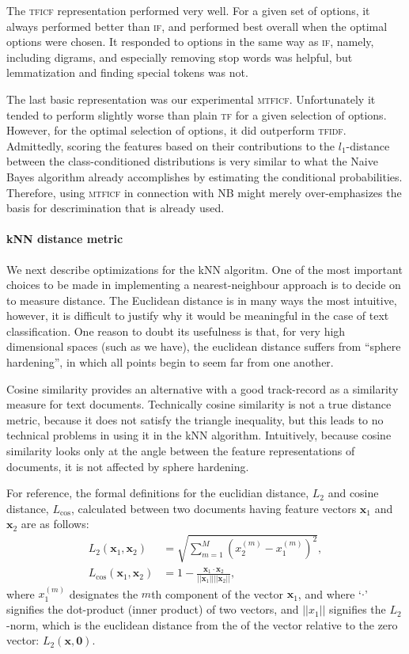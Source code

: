 \documentclass[conference,letterpaper]{IEEEtran}
\begin{document}
The \textsc{tficf} representation performed very well.  For a given set of 
options, it always performed better than \textsc{if}, and performed best 
overall when the optimal options were chosen.  It responded to options in the 
same
way as \textsc{if}, namely, including digrams, and especially removing stop
words was helpful, but lemmatization and finding special tokens was not.

The last basic representation was our experimental \textsc{mtficf}.  
Unfortunately it tended to perform slightly worse than plain \textsc{tf} for
a given selection of options.  However, for the optimal selection of options,
it did outperform \textsc{tfidf}.  Admittedly, scoring the 
features based on their contributions to the $l_1$-distance between the 
class-conditioned distributions is very similar to what the Naive Bayes 
algorithm already accomplishes by estimating the conditional probabilities.
Therefore, using \textsc{mtficf} in connection with NB might merely 
over-emphasizes the basis for descrimination that is already used.


\paragraph*{kNN distance metric}
We next describe optimizations for the kNN algoritm.  One of the most important
choices to be made in implementing a nearest-neighbour approach is to decide
on to measure distance.  The Euclidean distance is in many ways
the most intuitive, however, it is difficult to justify why it would be
meaningful in the case of text classification.  One reason to doubt its 
usefulness is that, for very high dimensional spaces (such as we have), 
the euclidean distance suffers from ``sphere hardening'', in which all points
begin to seem far from one another.

Cosine similarity provides an alternative with a good track-record as a 
similarity measure for text documents.  Technically cosine similarity is not
a true distance metric, because it does not satisfy the triangle inequality,
but this leads to no technical problems in using it in the kNN algorithm.
Intuitively, because cosine similarity looks only at the angle between 
the feature representations of documents, it is not affected by sphere 
hardening.  

For reference, the formal definitions for the euclidian distance, $L_2$ and
cosine distance, $L_\mathrm{cos}$, calculated between two documents having 
feature vectors $\mathbf{x}_1$ and $\mathbf{x}_2$ are as follows:
\begin{align}
	L_2(\mathbf{x}_1, \mathbf{x}_2) 
		&= \sqrt{\sum_{m=1}^M (x_2^{(m)} - x_1^{(m)})^2}, \\
	L_\mathrm{cos}(\mathbf{x}_1, \mathbf{x}_2) 
		&= 1 - \frac{\mathbf{x}_1 \cdot \mathbf{x}_2}
			{||\mathbf{x}_1|| ||\mathbf{x}_2||},
\end{align}
where $x_1^{(m)}$ designates the $m$th component of the vector $\mathbf{x}_1$,
and where `$\cdot$' signifies the dot-product (inner product) of two vectors,
and $||x_1||$ signifies the $L_2$-norm, which is the euclidean distance from
the of the vector relative to the zero vector: $L_2(\mathbf{x}, \mathbf{0})$.
\end{document}
